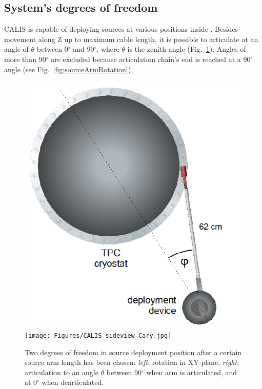 \subsection{System's degrees of freedom}

CALIS is capable of deploying sources at various positions inside \lsv. Besides movement along Z up to maximum cable length, it is possible to articulate at an angle of $\theta$ between 0$^{\circ}$ and 90$^{\circ}$, where $\theta$ is the zenith-angle (Fig.~\ref{fig:coordinate_system}). Angles of more than 90$^{\circ}$ are excluded because articulation chain's end is reached at a 90$^{\circ}$ angle (see Fig.~\ref{fig:sourceArmRotation}).

\begin{figure}[htbp]
 \centering
  \includegraphics[height=0.37\textheight,clip=true]{Figures/DeploymentDevice_XY_view}
  \texttt{[image: Figures/CALIS\_sideview\_Cary.jpg]}
  \caption{Two degrees of freedom in source deployment position after a certain source arm length has been chosen: \textit{left}: rotation in XY-plane, \textit{right:} articulation to an angle $\theta$ between 90$^{\circ}$ when arm is articulated, and at 0$^{\circ}$ when dearticulated. }
  \label{fig:coordinate_system}
\end{figure} 

